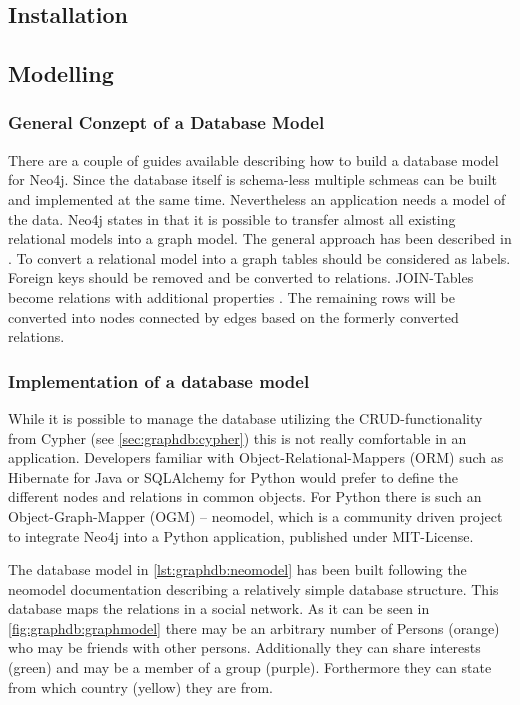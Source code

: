 \subsection{Installation}

\subsection{Modelling}
\subsubsection{General Conzept of a Database Model}
There are a couple of guides available describing how to build a database model for Neo4j. Since the database itself is schema-less multiple schmeas can be built and implemented at the same time.
Nevertheless an application needs a model of the data.
Neo4j states in \cite{neo4j:rel_to_graph} that it is possible to transfer almost all existing relational models into a graph model.
The general approach has been described in \cite{dzone:rel_to_graph}.
To convert a relational model into a graph tables should be considered as labels.
Foreign keys should be removed and be converted to relations.
JOIN-Tables become relations with additional properties \cite{neo4j:graph_vs_rdbms}.
The remaining rows will be converted into nodes connected by edges based on the formerly converted relations.

\subsubsection{Implementation of a database model}
While it is possible to manage the database utilizing the CRUD-functionality from Cypher (see \ref{sec:graphdb:cypher}) this is not really comfortable in an application.
Developers familiar with Object-Relational-Mappers (ORM) such as Hibernate for Java or SQLAlchemy for Python would prefer to define the different nodes and relations in common objects.
For Python there is such an Object-Graph-Mapper (OGM) -- neomodel, which is a community driven project to integrate Neo4j into a Python application, published under MIT-License.

The database model in \ref{lst:graphdb:neomodel} has been built following the neomodel documentation \cite{neomodel:rtd} describing a relatively simple database structure.
This database maps the relations in a social network.
As it can be seen in \ref{fig:graphdb:graphmodel} there may be an arbitrary number of Persons (orange) who may be friends with other persons.
Additionally they can share interests (green) and may be a member of a group (purple).
Forthermore they can state from which country (yellow) they are from.

